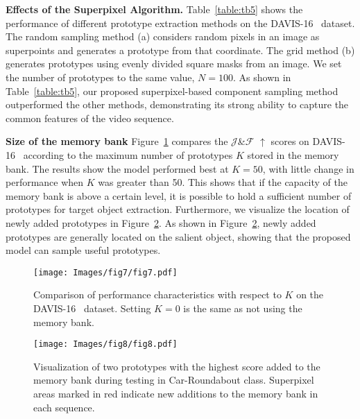 \documentclass[10pt,twocolumn,letterpaper]{article}
\begin{document}
\noindent
\textbf{Effects of the Superpixel Algorithm.} Table~\ref{table:tb5} shows the performance of different prototype extraction methods on the DAVIS-16~\cite{perazzi2016benchmark} dataset. The random sampling method (a) considers random pixels in an image as superpoints and generates a prototype from that coordinate. The grid method (b) generates prototypes using evenly divided square masks from an image. We set the number of prototypes to the same value, $N = 100$. As shown in Table~\ref{table:tb5}, our proposed superpixel-based component sampling method outperformed the other methods, demonstrating its strong ability to capture the common features of the video sequence.

\noindent
\textbf{Size of the memory bank} Figure~\ref{fig:graph} compares the $\mathcal{J}$\&$\mathcal{F}$ $\uparrow$ scores on DAVIS-16~\cite{perazzi2016benchmark} according to the maximum number of prototypes $K$ stored in the memory bank. The results show the model performed best at $K=50$, with little change in performance when $K$ was greater than 50. This shows that if the capacity of the memory bank is above a certain level, it is possible to hold a sufficient number of prototypes for target object extraction. Furthermore, we visualize the location of newly added prototypes in Figure~\ref{fig:last}. As shown in Figure~\ref{fig:last}, newly added prototypes are generally located on the salient object, showing that the proposed model can sample useful prototypes.

\begin{figure}[t]
	\setlength{\belowcaptionskip}{-24pt}
	\begin{center}
		\texttt{[image: Images/fig7/fig7.pdf]}
		\caption{Comparison of performance characteristics with respect to $K$ on the DAVIS-16~\cite{perazzi2016benchmark} dataset. Setting $K = 0$ is the same as not using the memory bank.}
		\label{fig:graph}
	\end{center}
\end{figure}

\begin{figure}[t]
	\setlength{\belowcaptionskip}{-24pt}
	\begin{center}
		\texttt{[image: Images/fig8/fig8.pdf]}
		\caption{Visualization of two prototypes with the highest score added to the memory bank during testing in Car-Roundabout class. Superpixel areas marked in red indicate new additions to the memory bank in each sequence.}
		\label{fig:last}
	\end{center}
\end{figure}
\end{document}
